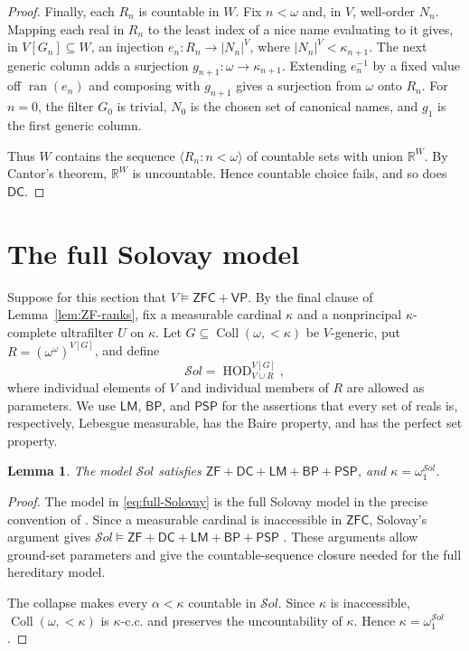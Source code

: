 \documentclass[11pt,a4paper]{amsart}
\newcommand{\VP}{\mathsf{VP}}
\newcommand{\ZF}{\mathsf{ZF}}
\newcommand{\ZFC}{\mathsf{ZFC}}
\newcommand{\HOD}{\operatorname{HOD}}
\newcommand{\Coll}{\operatorname{Coll}}
\newcommand{\DC}{\mathsf{DC}}
\newcommand{\LM}{\mathsf{LM}}
\newcommand{\BP}{\mathsf{BP}}
\newcommand{\PSP}{\mathsf{PSP}}
\theoremstyle{plain}
\newtheorem{lemma}[theorem]{Lemma}
\theoremstyle{definition}
\theoremstyle{remark}
\begin{document}
\begin{proof}
Finally, each $R_n$ is countable in $W$.  {Fix $n<\omega$ and, in $V$, well-order $N_n$.  Mapping each real in $R_n$ to the least index of a nice name evaluating to it gives, in $V[G_n]\subseteq W$, an injection $e_n:R_n\longrightarrow |N_n|^V$, where $|N_n|^V<\kappa_{n+1}$.
{The next generic column adds a surjection $g_{n+1}:\omega\to\kappa_{n+1}$.  Extending $e_n^{-1}$ by a fixed value off $\operatorname{ran}(e_n)$ and composing with $g_{n+1}$ gives a surjection from $\omega$ onto $R_n$.  For $n=0$, the filter $G_0$ is trivial, $N_0$ is the chosen set of canonical names, and $g_1$ is the first generic column.}}

Thus $W$ contains the sequence $\langle R_n:n<\omega\rangle$ of countable sets with union $\mathbb R^W$.  By Cantor's theorem, $\mathbb R^W$ is uncountable.  Hence countable choice fails, and so does $\DC$.
\end{proof}
\endgroup

\section{The full Solovay model}

Suppose for this section that $V\models\ZFC+\VP$.  By the final clause of Lemma~\ref{lem:ZF-ranks}, fix a measurable cardinal $\kappa$ and a nonprincipal $\kappa$-complete ultrafilter $U$ on $\kappa$.  Let
$G\subseteq{\Coll}(\omega,{<}\kappa)$ be $V$-generic, put
$R=(\omega^\omega)^{V[G]}$, and define
\begin{equation}\label{eq:full-Solovay}
\mathcal S\!ol=\HOD_{V\cup R}^{V[G]},
\end{equation}
where individual elements of $V$ and individual members of $R$ are allowed as parameters.  We use $\LM$, $\BP$, and $\PSP$ for the assertions that every set of reals is, respectively, Lebesgue measurable, has the Baire property, and has the perfect set property.

\begin{lemma}\label{lem:Solovay-regularity}
The model $\mathcal S\!ol$ satisfies
$\ZF+\DC+\LM+\BP+\PSP$, and $\kappa=\omega_1^{\mathcal S\!ol}$.
\end{lemma}

\begin{proof}
The model in \eqref{eq:full-Solovay} is the full Solovay model in the precise convention of \cite[Definition~4 and the following paragraph]{SakaiTanno}.  {\color{auditgreen}Since a measurable cardinal is inaccessible in $\ZFC$, Solovay's argument gives
$\mathcal S\!ol\models\ZF+\DC+\LM+\BP+\PSP$ \cite[III, Sections~1.3--1.11 and~2.4--2.11]{Solovay}.  These arguments allow ground-set parameters and give the countable-sequence closure needed for the full hereditary model.}

The collapse makes every $\alpha<\kappa$ countable in $\mathcal S\!ol$.  Since $\kappa$ is inaccessible, ${\Coll}(\omega,{<}\kappa)$ is $\kappa$-c.c. and preserves the uncountability of $\kappa$.  Hence $\kappa=\omega_1^{\mathcal S\!ol}$.
\end{proof}
\end{document}
